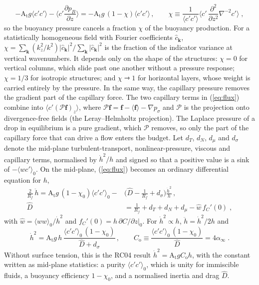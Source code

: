 \documentclass[lineno]{jfm}
\newcommand{\avg}[1]{\langle #1\rangle}
\newcommand{\At}{\mathrm{A_t}}
\newcommand{\hd}{\dot h}
\newcommand{\pd}[2]{\frac{\partial #1}{\partial #2}}
\begin{document}
\begin{equation}
  -\At g \avg{c' c'} - \Big\langle c' \pd{p_B}{z} \Big\rangle = -\At g \,(1 - \chi) \avg{c' c'} \, , \qquad \chi \equiv \frac{1}{\avg{c' c'}} \Big\langle c' \, \frac{\partial^2}{\partial z^2} \nabla^{-2} c' \Big\rangle \;,
  \label{eq:chi}
\end{equation}
so the buoyancy pressure cancels a fraction $\chi$ of the buoyancy production. For a statistically homogeneous field with Fourier coefficients $\hat c_{\mathbf k}$, $\chi = \sum_{\mathbf k} (k_z^2/k^2) | \hat c_{\mathbf k} |^2 / \sum_{\mathbf k} | \hat c_{\mathbf k} |^2$ is the fraction of the indicator variance at vertical wavenumbers. It depends only on the shape of the structures: $\chi = 0$ for vertical columns, which slide past one another without a pressure response; $\chi = 1/3$ for isotropic structures; and $\chi \rightarrowtriangle 1$ for horizontal layers, whose weight is carried entirely by the pressure. In the same way, the capillary pressure removes the gradient part of the capillary force. The two capillary terms in (\ref{eq:flux}) combine into $\avg{c' (\mathcal P \mathbf f)_z}$, where $\mathcal P \mathbf f = \mathbf f - \avg{\mathbf f} - \nabla p_\sigma$ and $\mathcal P$ is the projection onto divergence-free fields (the Leray--Helmholtz projection). The Laplace pressure of a drop in equilibrium is a pure gradient, which $\mathcal P$ removes, so only the part of the capillary force that can drive a flow enters the budget. Let $d_T$, $d_N$, $d_\mu$ and $d_\sigma$ denote the mid-plane turbulent-transport, nonlinear-pressure, viscous and capillary terms, normalised by $\hd^2/h$ and signed so that a positive value is a sink of $-\avg{w c'}_0$. On the mid-plane, (\ref{eq:flux}) becomes an ordinary differential equation for $h$,
\begin{align}
\frac{2}{R_f} \, \ddot h = \At g \,(1 - \chi_0) \avg{c' c'}_0 - &\Big(\hat D - \frac{1}{R_f} + d_\sigma\Big) \frac{\hd^2}{h} \,, \nonumber \\ \hat D & = \frac{1}{R_f} + d_T + d_N + d_\mu - \hat w \, f_C'(0) \;, \label{eq:ode}
\end{align}
with $\hat w = \avg{w w}_0/\hd^2$ and $f_C'(0) = h \, \partial C/\partial z |_0$. For $\hd^2 \propto h$, $\ddot h = \hd^2/2 h$ and
\begin{equation}
  \hd^2 = \At g \, h \, \frac{\avg{c' c'}_0 \,(1 - \chi_0)}{\hat D + d_\sigma} \, , \qquad C_\mathrm{o} \equiv \frac{\avg{c' c'}_0 \,(1 - \chi_0)}{\hat D} = 4 \alpha_\infty \;.
  \label{eq:alpha}
\end{equation}
Without surface tension, this is the RC04 result $\hd^2 = \At g C_\mathrm{o} h$, with the constant written as mid-plane statistics: a purity $\avg{c' c'}_0$, which is unity for immiscible fluids, a buoyancy efficiency $1 - \chi_0$, and a normalised inertia and drag $\hat D$.
\end{document}
